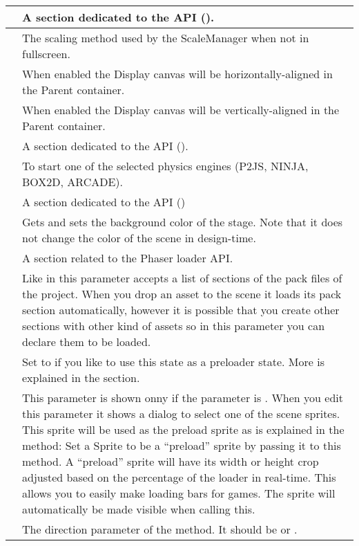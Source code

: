 \documentclass[letterpaper,10pt,english]{sphinxmanual}
\begin{document}
\begin{savenotes}
\begin{tabulary}{\linewidth}[t]{|T|T|}
&
A section dedicated to the  API ().
\\
\hline
{}
&
The scaling method used by the ScaleManager when not in fullscreen.
\\
\hline
{}
&
When enabled the Display canvas will be horizontally-aligned in the Parent container.
\\
\hline
{}
&
When enabled the Display canvas will be vertically-aligned in the Parent container.
\\
\hline
{}
&
A section dedicated to the  API ().
\\
\hline
{}
&
To start one of the selected physics engines (P2JS, NINJA, BOX2D, ARCADE).
\\
\hline
{}
&
A section dedicated to the  API ()
\\
\hline
{}
&
Gets and sets the background color of the stage. Note that it does not change the color of the scene in design-time.
\\
\hline
{}
&
A section related to the Phaser loader API.
\\
\hline
{}
&
Like in  this parameter accepts a list of sections of the pack files of the project. When you drop an asset to the scene it loads its pack section automatically, however it is possible that you create other sections with other kind of assets so in this parameter you can declare them to be loaded.
\\
\hline
{}
&
Set to  if you like to use this state as a preloader state. More is explained in the {\hyperref[\detokenize{canvas:preloader-state-configuration}]{}} section.
\\
\hline
{}
&
This parameter is shown onny if the  parameter is . When you edit this parameter it shows a dialog to select one of the scene sprites. This sprite will be used as the preload sprite as is explained in the  method: Set a Sprite to be a “preload” sprite by passing it to this method. A “preload” sprite will have its width or height crop adjusted based on the percentage of the loader in real-time. This allows you to easily make loading bars for games. The sprite will automatically be made visible when calling this.
\\
\hline
{}
&
The direction parameter of the  method. It should be  or .
\\
\hline
\end{tabulary}
\par
\sphinxattableend\end{savenotes}
\end{document}
